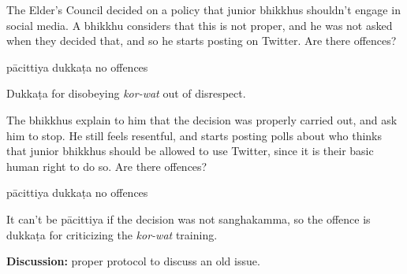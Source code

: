 \begin{exam}{\autoExamName}
  \problemDivide

  \begin{problem*}

    \begin{parts}

    \item The Elder's Council decided on a policy that junior bhikkhus shouldn't
      engage in social media. A bhikkhu considers that this is not proper, and
      he was not asked when they decided that, and so he starts posting on
      Twitter.
      Are there offences?

    \bigskip

      \begin{answers}{3}
        \bChoices
         pācittiya\eAns
         dukkaṭa\eAns
         no offences\eAns
        \eChoices
      \end{answers}

      \begin{solution}
        Dukkaṭa for disobeying \emph{kor-wat} out of disrespect.
      \end{solution}

    \item The bhikkhus explain to him that the decision was properly carried
      out, and ask him to stop. He still feels resentful, and starts posting
      polls about who thinks that junior bhikkhus should be allowed to use
      Twitter, since it is their basic human right to do so. Are there offences?

    \bigskip

      \begin{answers}{3}
        \bChoices
         pācittiya\eAns
         dukkaṭa\eAns
         no offences\eAns
        \eChoices
      \end{answers}

      \begin{solution}
        It can't be pācittiya if the decision was not sanghakamma, so the
        offence is dukkaṭa for criticizing the \emph{kor-wat} training.
      \end{solution}

      \bigskip
      
      \textbf{Discussion:} proper protocol to discuss an old issue.

    \end{parts}

  \end{problem*}

  \problemDivide


\end{exam}
